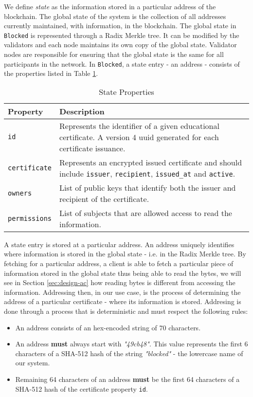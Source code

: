 We define \textit{state} as the information stored in a particular address of the blockchain. The global state of the system is the collection of all addresses currently maintained, with information, in the blockchain. The global state in \texttt{Blocked} is represented through a Radix Merkle tree. It can be modified by the validators and each node maintains its own copy of the global state. Validator nodes are responsible for ensuring that the global state is the same for all participants in the network. In \texttt{Blocked}, a state entry - an address - consists of the properties listed in Table \ref{tab:stateProperties}.

{
\renewcommand{\arraystretch}{1.5}%
\begin{table}[htb]
	\centering
	\caption{State Properties}
	\label{tab:stateProperties}
	\begin{tabular}{p{}|p{}}
		\hline \bf Property & \bf Description \\ \hline
		\texttt{id}           &  Represents the identifier of a given educational certificate. A version 4 \gls{uuid} generated for each certificate issuance. \\ \hline
		\texttt{certificate}  & Represents an encrypted issued certificate and should include \texttt{issuer}, \texttt{recipient}, \texttt{issued\_at} and \texttt{active}. \\ \hline
		\texttt{owners}       &  List of public keys that identify both the issuer and recipient of the certificate. \\ \hline
		\texttt{permissions}  &  List of subjects that are allowed access to read the information.\\
		\hline
	\end{tabular}
\end{table}
}

A state entry is stored at a particular address. An address uniquely identifies where information is stored in the global state - i.e. in the Radix Merkle tree. By fetching for a particular address, a client is able to fetch a particular piece of information stored in the global state thus being able to read the bytes, we will see in Section \ref{sec:design-ac} how reading bytes is different from accessing the information. Addressing then, in our use case, is the process of determining the address of a particular certificate - where its information is stored. Addresing is done through a process that is deterministic and must respect the following rules: 

\begin{itemize}
	\item An address consists of an hex-encoded string of 70 characters.
	\item An address \textbf{must} always start with \emph{"49cb48"}. This value represents the first 6 characters of a SHA-512 hash of the string \emph{"blocked"} - the lowercase name of our system.
	\item Remaining 64 characters of an address \textbf{must} be the first 64 characters of a SHA-512 hash of the certificate property \texttt{id}.
\end{itemize}

